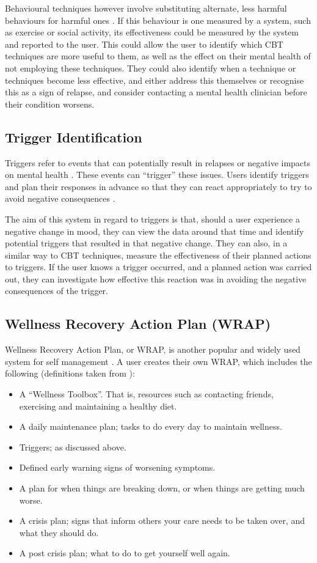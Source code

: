 \documentclass[11pt,openright,a4paper]{report}
\begin{document}
Behavioural techniques however involve substituting alternate, less harmful behaviours for harmful ones \parencite{patientcbt}. If this behaviour is one measured by a system, such as exercise or social activity, its effectiveness could be measured by the system and reported to the user. This could allow the user to identify which CBT techniques are more useful to them, as well as the effect on their mental health of not employing these techniques. They could also identify when a technique or techniques become less effective, and either address this themselves or recognise this as a sign of relapse, and consider contacting a mental health clinician before their condition worsens.

\subsection{Trigger Identification}
Triggers refer to events that can potentially result in relapses or negative impacts on mental health \parencite{samhsatriggers}. These events can \enquote{trigger} these issues. Users identify triggers and plan their responses in advance so that they can react appropriately to try to avoid negative consequences \parencite{samhsatriggers}.

The aim of this system in regard to triggers is that, should a user experience a negative change in mood, they can view the data around that time and identify potential triggers that resulted in that negative change. They can also, in a similar way to CBT techniques, measure the effectiveness of their planned actions to triggers. If the user knows a trigger occurred, and a planned action was carried out, they can investigate how effective this reaction was in avoiding the negative consequences of the trigger.

\subsection{Wellness Recovery Action Plan (WRAP)}
Wellness Recovery Action Plan, or WRAP, is another popular and widely used system for self management \parencite{mhrwrap}. A user creates their own WRAP, which includes the following (definitions taken from \parencite{mhrwrap}):
\begin{itemize}
\item A \enquote{Wellness Toolbox}. That is, resources such as contacting friends, exercising and maintaining a healthy diet.
\item A daily maintenance plan; tasks to do every day to maintain wellness.
\item Triggers; as discussed above.
\item Defined early warning signs of worsening symptoms.
\item A plan for when things are breaking down, or when things are getting much worse.
\item A crisis plan; signs that inform others your care needs to be taken over, and what they should do.
\item A post crisis plan; what to do to get yourself well again.
\end{itemize}
\end{document}
